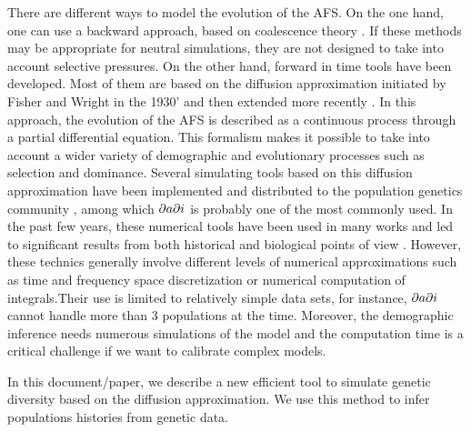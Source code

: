 There are different ways to model the evolution of the AFS. On the one hand, one can use a backward approach, based on coalescence theory \cite{excoffier2011}. If these methods may be appropriate for neutral simulations, they are not designed to take into account selective pressures. On the other hand, forward in time tools have been developed. Most of them are based on the diffusion approximation initiated by Fisher and Wright in the 1930' \cite{fisher1930, wright1931} and then extended more recently \cite{crow1970, kimura1964}. In this approach, the evolution of the AFS is described as a continuous process through a partial differential equation. This formalism makes it possible to take into account a wider variety of demographic and evolutionary processes such as selection and dominance. Several simulating tools based on this diffusion approximation have been implemented and distributed to the population genetics community \cite{gutenkunst2009, lukic2012, lukic2011}, among which $\partial a \partial i$ is probably one of the most commonly used. In the past few years, these numerical tools have been used in many works and led to significant results from both historical and biological points of view \cite{gutenkunst2009, gravel2011, schmutz2014}. However, these technics generally involve different levels of numerical approximations such as time and frequency space discretization or numerical computation of integrals.Their use is limited to relatively simple data sets, for instance, $\partial a \partial i$ cannot handle more than 3 populations at the time. Moreover, the demographic inference needs numerous simulations of the model and the computation time is a critical challenge if we want to calibrate complex models.

In this document/paper, we describe a new efficient tool to simulate genetic diversity based on the diffusion approximation. We use this method to infer populations histories from genetic data.